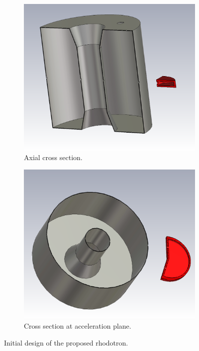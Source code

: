\documentclass[a4paper,oneside,12pt]{report}
\numberwithin{equation}{chapter}
\begin{document}
\begin{figure}[H]
    \captionsetup[subfigure]{justification=centering}
    \captionsetup{justification=centering}
    \centering
    \begin{subfigure}{.5\textwidth}
      \centering
      \includegraphics[width=.92\linewidth]{./figures/cst/cst_first_design3.png}
      \caption{Axial cross section.}
    \end{subfigure}%
    \centering
    \begin{subfigure}{.5\textwidth}
      \centering
      \includegraphics[width=.9\linewidth]{./figures/cst/cst_first_design2.png}
      \caption{Cross section at acceleration plane.}
    \end{subfigure}
    \caption{Initial design of the proposed rhodotron.}
    \label{fig:initial_design_cross_section}
\end{figure}
\end{document}
